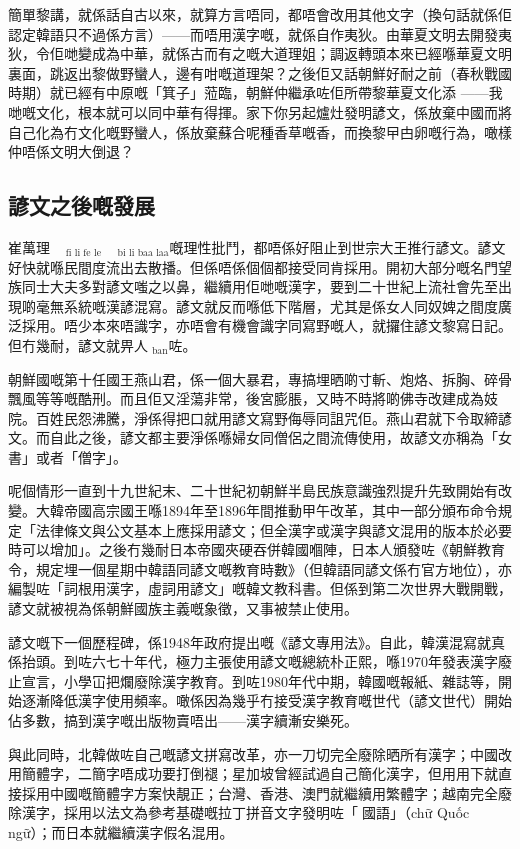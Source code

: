 簡單黎講，就係話自古以來，就算方言唔同，都唔會改用其他文字（換句話就係佢認定韓語只不過係方言）——而唔用漢字嘅，就係自作夷狄。由華夏文明去開發夷狄，令佢哋變成為中華，就係古而有之嘅大道理姐；調返轉頭本來已經喺華夏文明裏面，跳返出黎做野蠻人，邊有咁嘅道理架？之後佢又話朝鮮好耐之前（春秋戰國時期）就已經有中原嘅「箕子」蒞臨，朝鮮仲繼承咗佢所帶黎華夏文化添
——我哋嘅文化，根本就可以同中華有得揮。家下你另起爐灶發明諺文，係放棄中國而將自己化為冇文化嘅野蠻人，係放棄蘇合呢種香草嘅香，而換黎曱甴卵嘅行為，噉樣仲唔係文明大倒退？

\subsection*{諺文之後嘅發展}

崔萬理$_{\text{fi li fe le}}$$_{\text{bi li baa laa}}$嘅理性批鬥，都唔係好阻止到世宗大王推行諺文。諺文好快就喺民間度流出去散播。但係唔係個個都接受同肯採用。開初大部分嘅名門望族同士大夫多對諺文嗤之以鼻，繼續用佢哋嘅漢字，要到二十世紀上流社會先至出現啲毫無系統嘅漢諺混寫。諺文就反而喺低下階層，尤其是係女人同奴婢之間度廣泛採用。唔少本來唔識字，亦唔會有機會識字同寫野嘅人，就攞住諺文黎寫日記。
但冇幾耐，諺文就畀人$_{\text{ban}}$咗。

朝鮮國嘅第十任國王燕山君，係一個大暴君，專搞埋晒啲寸斬、炮烙、拆胸、碎骨飄風等等嘅酷刑。而且佢又淫蕩非常，後宮膨脹，又時不時將啲佛寺改建成為妓院。百姓民怨沸騰，淨係得把口就用諺文寫野侮辱同詛咒佢。燕山君就下令取締諺文。而自此之後，諺文都主要淨係喺婦女同僧侶之間流傳使用，故諺文亦稱為「女書」或者「僧字」。

呢個情形一直到十九世紀末、二十世紀初朝鮮半島民族意識強烈提升先致開始有改變。大韓帝國高宗國王喺1894年至1896年間推動甲午改革，其中一部分頒布命令規定「法律條文與公文基本上應採用諺文；但全漢字或漢字與諺文混用的版本於必要時可以增加」。之後冇幾耐日本帝國夾硬吞併韓國嗰陣，日本人頒發咗《朝鮮教育令，規定埋一個星期中韓語同諺文嘅教育時數》（但韓語同諺文係冇官方地位），亦編製咗「詞根用漢字，虛詞用諺文」嘅韓文教科書。但係到第二次世界大戰開戰，諺文就被視為係朝鮮國族主義嘅象徵，又事被禁止使用。

諺文嘅下一個歷程碑，係1948年政府提出嘅《諺文專用法》。自此，韓漢混寫就真係抬頭。到咗六七十年代，極力主張使用諺文嘅總統朴正熙，喺1970年發表漢字廢止宣言，小學冚把爛廢除漢字教育。到咗1980年代中期，韓國嘅報紙、雜誌等，開始逐漸降低漢字使用頻率。噉係因為幾乎冇接受漢字教育嘅世代（諺文世代）開始佔多數，搞到漢字嘅出版物賣唔出——漢字續漸安樂死。

與此同時，北韓做咗自己嘅諺文拼寫改革，亦一刀切完全廢除晒所有漢字；中國改用簡體字，二簡字唔成功要打倒褪；星加坡曾經試過自己簡化漢字，但用用下就直接採用中國嘅簡體字方案快靚正；台灣、香港、澳門就繼續用繁體字；越南完全廢除漢字，採用以法文為參考基礎嘅拉丁拼音文字發明咗「𡨸國語」（chữ
Quốc ngữ）；而日本就繼續漢字假名混用。

